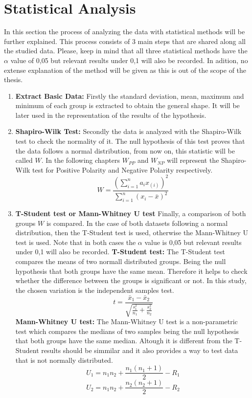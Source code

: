 \section{Statistical Analysis}
\label{sec:statistical_analysis}
In this section the process of analyzing the data with statistical methods will be further explained.
This process consists of 3 main steps that are shared along all the studied data. Please, keep in mind that all three
statistical methods have the $\alpha$ value of 0,05 but relevant results under 0,1 will also be recorded. In adition, 
no extense explanation of the method will be given as this is out of the scope of the thesis.
\begin{enumerate}
    \item \textbf{Extract Basic Data:} Firstly the standard deviation, mean, maximum and minimum of each group
    is extracted to obtain the general shape. It will be later used in the representation of the results of the hypothesis.
    \item \textbf{Shapiro-Wilk Test\cite{shapiro-wilk}:} Secondly the data is analyzed with the Shapiro-Wilk test to check
    the normality of it. The null hypothesis of this test proves that the data follows a normal distribution, from now
    on, this statistic will be called $W$. In the following chapters $W_{PP}$ and  $W_{NP}$ will represent the Shapiro-Wilk test
    for Positive Polarity and Negative Polarity respectively.
    $$W = \frac{(\sum_{i=1}^n a_i x_{(i)})^2}{\sum_{i=1}^n (x_i - \bar{x})^2}$$
    \item \textbf{T-Student test\cite{t-test} or Mann-Whitney U\cite{mann-whitney} test\:} Finally, a comparison of both groups
    $W$ is compared. In the case of both datasets following a normal distribution, then the T-Student test is used, otherwise 
    the Mann-Whitney U test is used. Note that in both cases the $\alpha$ value is 0,05 but relevant results under 0,1 will also
    be recorded. 
    \subitem \textbf{T-Student test:} The T-Student test compares the means of two normall distributed groups. Being the
    null hypothesis that both groups have the same mean. Therefore it helps to check whether the difference between
    the groups is significant or not. In this study, the chosen variation is the independent samples test.
    $$ t = \frac{\bar{x}_1 - \bar{x}_2}{\sqrt{\frac{s_1^2}{n_1} + \frac{s_2^2}{n_2}}} $$
    \subitem \textbf{Mann-Whitney U test:} The Mann-Whitney U test is a non-parametric test which compares the medians of 
    two samples being the null hypothesis that both groups have the same median. Altough it is different from the T-Student
    results should be simmilar and it also provides a way to test data that is not normally distributed.
    $$ U_1 = n_1 n_2 + \frac{n_1 (n_1 + 1)}{2} - R_1 $$
    $$ U_2 = n_1 n_2 + \frac{n_2 (n_2 + 1)}{2} - R_2 $$
\end{enumerate}
